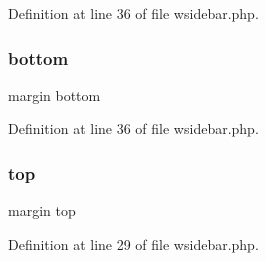 Definition at line 36 of file wsidebar.\+php.

\mbox{\label{wsidebar_8php_a9034efd9266ed643f35aa86e8ca32ac2}} 
\subsubsection{\texorpdfstring{bottom}{bottom}}
{\footnotesize\ttfamily margin bottom}



Definition at line 36 of file wsidebar.\+php.

\mbox{\label{wsidebar_8php_a92a4f9c60f5fc724a2e9a4fdb35e9777}} 
\subsubsection{\texorpdfstring{top}{top}}
{\footnotesize\ttfamily margin top}



Definition at line 29 of file wsidebar.\+php.

